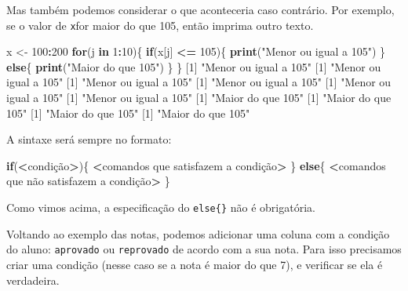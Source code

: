\documentclass[10pt,a4paper]{book}
\newenvironment{Shaded}{\begin{snugshade}}{\end{snugshade}}
\newcommand{\KeywordTok}[1]{\textcolor[rgb]{0.13,0.29,0.53}{\textbf{#1}}}
\newcommand{\DecValTok}[1]{\textcolor[rgb]{0.00,0.00,0.81}{#1}}
\newcommand{\StringTok}[1]{\textcolor[rgb]{0.31,0.60,0.02}{#1}}
\newcommand{\ControlFlowTok}[1]{\textcolor[rgb]{0.13,0.29,0.53}{\textbf{#1}}}
\newcommand{\OperatorTok}[1]{\textcolor[rgb]{0.81,0.36,0.00}{\textbf{#1}}}
\newcommand{\NormalTok}[1]{#1}
\begin{document}
Mas também podemos considerar o que aconteceria caso contrário. Por
exemplo, se o valor de \texttt{x}for maior do que 105, então imprima
outro texto.

\begin{Shaded}
\begin{Highlighting}[]
\NormalTok{x <-}\StringTok{ }\DecValTok{100}\OperatorTok{:}\DecValTok{200}
\ControlFlowTok{for}\NormalTok{(j }\ControlFlowTok{in} \DecValTok{1}\OperatorTok{:}\DecValTok{10}\NormalTok{)\{}
    \ControlFlowTok{if}\NormalTok{(x[j] }\OperatorTok{<=}\StringTok{ }\DecValTok{105}\NormalTok{)\{}
        \KeywordTok{print}\NormalTok{(}\StringTok{"Menor ou igual a 105"}\NormalTok{)}
\NormalTok{    \} }\ControlFlowTok{else}\NormalTok{\{}
        \KeywordTok{print}\NormalTok{(}\StringTok{"Maior do que 105"}\NormalTok{)}
\NormalTok{    \}}
\NormalTok{\}}
\NormalTok{[}\DecValTok{1}\NormalTok{] }\StringTok{"Menor ou igual a 105"}
\NormalTok{[}\DecValTok{1}\NormalTok{] }\StringTok{"Menor ou igual a 105"}
\NormalTok{[}\DecValTok{1}\NormalTok{] }\StringTok{"Menor ou igual a 105"}
\NormalTok{[}\DecValTok{1}\NormalTok{] }\StringTok{"Menor ou igual a 105"}
\NormalTok{[}\DecValTok{1}\NormalTok{] }\StringTok{"Menor ou igual a 105"}
\NormalTok{[}\DecValTok{1}\NormalTok{] }\StringTok{"Menor ou igual a 105"}
\NormalTok{[}\DecValTok{1}\NormalTok{] }\StringTok{"Maior do que 105"}
\NormalTok{[}\DecValTok{1}\NormalTok{] }\StringTok{"Maior do que 105"}
\NormalTok{[}\DecValTok{1}\NormalTok{] }\StringTok{"Maior do que 105"}
\NormalTok{[}\DecValTok{1}\NormalTok{] }\StringTok{"Maior do que 105"}
\end{Highlighting}
\end{Shaded}

A sintaxe será sempre no formato:

\begin{Shaded}
\begin{Highlighting}[]
\ControlFlowTok{if}\NormalTok{(}\OperatorTok{<}\NormalTok{condição}\OperatorTok{>}\NormalTok{)\{}
    \OperatorTok{<}\NormalTok{comandos que satisfazem a condição}\OperatorTok{>}
\NormalTok{\} }\ControlFlowTok{else}\NormalTok{\{}
   \OperatorTok{<}\NormalTok{comandos que não satisfazem a condição}\OperatorTok{>}
\NormalTok{\}}
\end{Highlighting}
\end{Shaded}

Como vimos acima, a especificação do \texttt{else\{\}} não é
obrigatória.

Voltando ao exemplo das notas, podemos adicionar uma coluna com a
condição do aluno: \texttt{aprovado} ou \texttt{reprovado} de acordo com
a sua nota. Para isso precisamos criar uma condição (nesse caso se a
nota é maior do que 7), e verificar se ela é verdadeira.
\end{document}
